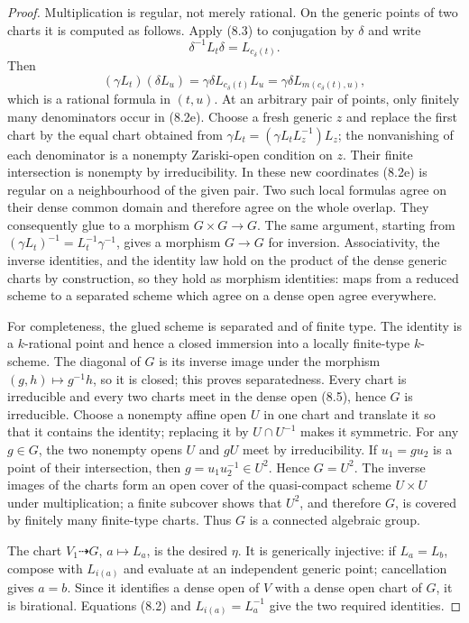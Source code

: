 \documentclass[11pt,oneside]{article}
\theoremstyle{definition}
\theoremstyle{remark}
\begin{document}
\begin{proof}
Multiplication is regular, not merely rational.  On the generic points of two charts it
is computed as follows.  Apply (8.3) to conjugation by $\delta$ and write
\[
 \delta^{-1}L_t\delta=L_{c_\delta(t)}.
\]
Then
\[
  (\gamma L_t)(\delta L_u)
   =\gamma\delta L_{c_\delta(t)}L_u
   =\gamma\delta L_{m(c_\delta(t),u)},                         \tag{8.2e}
\]
which is a rational formula in $(t,u)$.  At an arbitrary pair of points, only finitely
many denominators occur in (8.2e).  Choose a fresh generic $z$ and replace the first
chart by the equal chart obtained from
$\gamma L_t=(\gamma L_tL_z^{-1})L_z$; the nonvanishing of each denominator is a
nonempty Zariski-open condition on $z$.  Their finite intersection is nonempty by
irreducibility.  In these new coordinates (8.2e) is regular on a neighbourhood of the
given pair.  Two such local formulas agree on their dense common domain and therefore
agree on the whole overlap.  They consequently glue to a morphism
$G\times G\to G$.  The same argument, starting from
$(\gamma L_t)^{-1}=L_t^{-1}\gamma^{-1}$, gives a morphism $G\to G$ for inversion.
Associativity, the inverse identities, and the identity law hold on the product of the
dense generic charts by construction, so they hold as morphism identities: maps from a
reduced scheme to a separated scheme which agree on a dense open agree everywhere.

For completeness, the glued scheme is separated and of finite type.  The identity is a
$k$-rational point and hence a closed immersion into a locally finite-type $k$-scheme.
The diagonal of $G$ is its inverse image under the morphism
$(g,h)\mapsto g^{-1}h$, so it is closed; this proves separatedness.  Every chart is
irreducible and every two charts meet in the dense open (8.5), hence $G$ is irreducible.
Choose a nonempty affine open $U$ in one chart and translate it so that it contains the
identity; replacing it by $U\cap U^{-1}$ makes it symmetric.  For any $g\in G$, the two
nonempty opens $U$ and $gU$ meet by irreducibility.  If $u_1=gu_2$ is a point of their
intersection, then $g=u_1u_2^{-1}\in U^2$.  Hence $G=U^2$.  The inverse images of the
charts form an open cover of the quasi-compact scheme $U\times U$ under multiplication;
a finite subcover shows that $U^2$, and therefore $G$, is covered by finitely many
finite-type charts.  Thus $G$ is a connected algebraic group.

The chart $V_1\dashrightarrow G$, $a\mapsto L_a$, is the desired $\eta$.  It is
generically injective: if $L_a=L_b$, compose with $L_{i(a)}$ and evaluate at an
independent generic point; cancellation gives $a=b$.  Since it identifies a dense open
of $V$ with a dense open chart of $G$, it is birational.  Equations (8.2) and
$L_{i(a)}=L_a^{-1}$ give the two required identities.


\end{proof}
\end{document}
